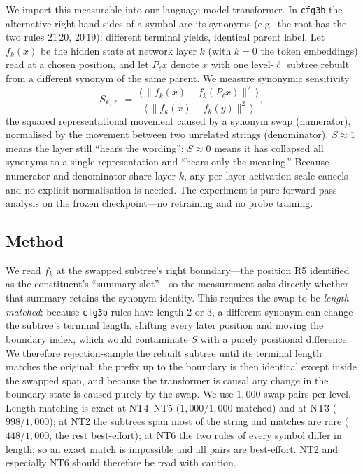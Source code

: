 \documentclass[10pt,twocolumn]{article}
\begin{document}
We import this measurable into our language-model transformer. In \texttt{cfg3b} the alternative right-hand sides of a symbol are its synonyms (e.g.\ the root has the two rules $21\,20$, $20\,19$): different terminal yields, identical parent label. Let $f_k(x)$ be the hidden state at network layer $k$ (with $k{=}0$ the token embeddings) read at a chosen position, and let $P_\ell x$ denote $x$ with one level-$\ell$ subtree rebuilt from a different synonym of the same parent. We measure synonymic sensitivity
\[
S_{k,\ell} \;=\; \frac{\big\langle\, \lVert f_k(x) - f_k(P_\ell x)\rVert^2 \,\big\rangle}{\big\langle\, \lVert f_k(x) - f_k(y)\rVert^2 \,\big\rangle},
\]
the squared representational movement caused by a synonym swap (numerator), normalised by the movement between two unrelated strings (denominator). $S\approx 1$ means the layer still ``hears the wording''; $S\approx 0$ means it has collapsed all synonyms to a single representation and ``hears only the meaning.'' Because numerator and denominator share layer $k$, any per-layer activation scale cancels and no explicit normalisation is needed. The experiment is pure forward-pass analysis on the frozen checkpoint---no retraining and no probe training.

\subsection{Method}

We read $f_k$ at the swapped subtree's right boundary---the position R5 identified as the constituent's ``summary slot''---so the measurement asks directly whether that summary retains the synonym identity. This requires the swap to be \emph{length-matched}: because \texttt{cfg3b} rules have length 2 or 3, a different synonym can change the subtree's terminal length, shifting every later position and moving the boundary index, which would contaminate $S$ with a purely positional difference. We therefore rejection-sample the rebuilt subtree until its terminal length matches the original; the prefix up to the boundary is then identical except inside the swapped span, and because the transformer is causal any change in the boundary state is caused purely by the swap. We use $1{,}000$ swap pairs per level. Length matching is exact at NT4--NT5 ($1{,}000/1{,}000$ matched) and at NT3 ($998/1{,}000$); at NT2 the subtrees span most of the string and matches are rare ($448/1{,}000$, the rest best-effort); at NT6 the two rules of every symbol differ in length, so an exact match is impossible and all pairs are best-effort. NT2 and especially NT6 should therefore be read with caution.
\end{document}
